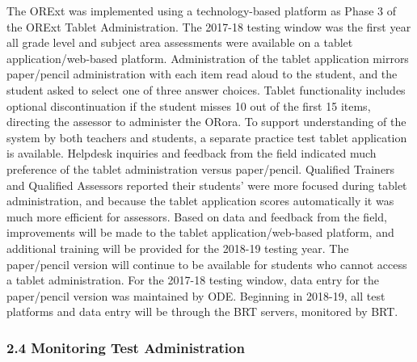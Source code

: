 \documentclass[]{article}
\begin{document}
The ORExt was implemented using a technology-based platform as Phase 3
of the ORExt Tablet Administration. The 2017-18 testing window was the
first year all grade level and subject area assessments were available
on a tablet application/web-based platform. Administration of the tablet
application mirrors paper/pencil administration with each item read
aloud to the student, and the student asked to select one of three
answer choices. Tablet functionality includes optional discontinuation
if the student misses 10 out of the first 15 items, directing the
assessor to administer the ORora. To support understanding of the system
by both teachers and students, a separate practice test tablet
application is available. Helpdesk inquiries and feedback from the field
indicated much preference of the tablet administration versus
paper/pencil. Qualified Trainers and Qualified Assessors reported their
students' were more focused during tablet administration, and because
the tablet application scores automatically it was much more efficient
for assessors. Based on data and feedback from the field, improvements
will be made to the tablet application/web-based platform, and
additional training will be provided for the 2018-19 testing year. The
paper/pencil version will continue to be available for students who
cannot access a tablet administration. For the 2017-18 testing window,
data entry for the paper/pencil version was maintained by ODE. Beginning
in 2018-19, all test platforms and data entry will be through the BRT
servers, monitored by BRT.

\subsubsection{2.4 Monitoring Test
Administration}\label{monitoring-test-administration}
\end{document}
